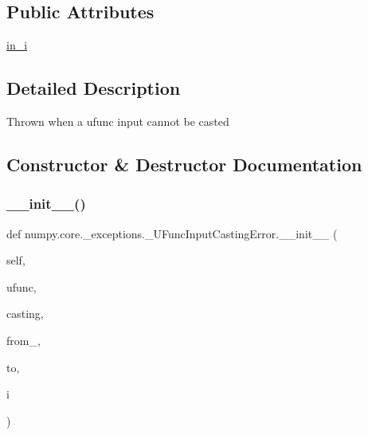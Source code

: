 \subsection*{Public Attributes}
\begin{DoxyCompactItemize}
\item 
\hyperlink{classnumpy_1_1core_1_1__exceptions_1_1__UFuncInputCastingError_a17c31e65d80653e0b4cedea6883d255f}{in\+\_\+i}
\end{DoxyCompactItemize}


\subsection{Detailed Description}
\begin{DoxyVerb}Thrown when a ufunc input cannot be casted \end{DoxyVerb}
 

\subsection{Constructor \& Destructor Documentation}
\mbox{\label{classnumpy_1_1core_1_1__exceptions_1_1__UFuncInputCastingError_ab07526751bd2c3122879a2e4680df00b}} 
\subsubsection{\texorpdfstring{\+\_\+\+\_\+init\+\_\+\+\_\+()}{\_\_init\_\_()}}
{\footnotesize\ttfamily def numpy.\+core.\+\_\+exceptions.\+\_\+\+U\+Func\+Input\+Casting\+Error.\+\_\+\+\_\+init\+\_\+\+\_\+ (\begin{DoxyParamCaption}\item[{}]{self,  }\item[{}]{ufunc,  }\item[{}]{casting,  }\item[{}]{from\+\_\+,  }\item[{}]{to,  }\item[{}]{i }\end{DoxyParamCaption})}



